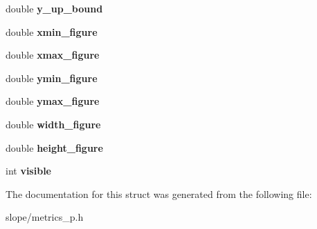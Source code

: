 \begin{DoxyCompactItemize}
\item 
\hypertarget{struct__slope__metrics_a7586b1c1f9cd7f80e929d3818534a20c}{double {\bfseries y\+\_\+up\+\_\+bound}}\label{struct__slope__metrics_a7586b1c1f9cd7f80e929d3818534a20c}

\item 
\hypertarget{struct__slope__metrics_a435925cdf5bd35658acfb48dcd707b66}{double {\bfseries xmin\+\_\+figure}}\label{struct__slope__metrics_a435925cdf5bd35658acfb48dcd707b66}

\item 
\hypertarget{struct__slope__metrics_ae5a8b9e2c17313f5e8df3ba3a3d29fd2}{double {\bfseries xmax\+\_\+figure}}\label{struct__slope__metrics_ae5a8b9e2c17313f5e8df3ba3a3d29fd2}

\item 
\hypertarget{struct__slope__metrics_a6000828f5bc6d9c83d66aa7899ff36dc}{double {\bfseries ymin\+\_\+figure}}\label{struct__slope__metrics_a6000828f5bc6d9c83d66aa7899ff36dc}

\item 
\hypertarget{struct__slope__metrics_a7351a93e448f8dd9441d9319fd984ac7}{double {\bfseries ymax\+\_\+figure}}\label{struct__slope__metrics_a7351a93e448f8dd9441d9319fd984ac7}

\item 
\hypertarget{struct__slope__metrics_a6c276a074789c36f794b053afc0e7267}{double {\bfseries width\+\_\+figure}}\label{struct__slope__metrics_a6c276a074789c36f794b053afc0e7267}

\item 
\hypertarget{struct__slope__metrics_a2251d1d4ddf5113421470ee169821d0b}{double {\bfseries height\+\_\+figure}}\label{struct__slope__metrics_a2251d1d4ddf5113421470ee169821d0b}

\item 
\hypertarget{struct__slope__metrics_a33d100a34f52fce1834dcb7766466fd0}{int {\bfseries visible}}\label{struct__slope__metrics_a33d100a34f52fce1834dcb7766466fd0}

\end{DoxyCompactItemize}


The documentation for this struct was generated from the following file\+:\begin{DoxyCompactItemize}
\item 
slope/metrics\+\_\+p.\+h\end{DoxyCompactItemize}
